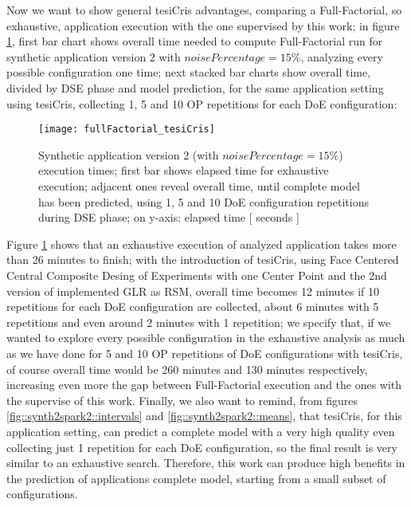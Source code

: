Now we want to show general tesiCris advantages, comparing a Full-Factorial, so exhaustive, application execution with the one supervised by this work; in figure \ref{fig::full_cris}, first bar chart shows overall time needed to compute Full-Factorial run for synthetic application version 2 with $noisePercentage = 15\%$, analyzing every possible configuration one time; next stacked bar charts show overall time, divided by DSE phase and model prediction, for the same application setting using tesiCris, collecting 1, 5 and 10 OP repetitions for each DoE configuration:

\begin{figure}[H]

    \centering
    \texttt{[image: fullFactorial\_tesiCris]}
    \caption{Synthetic application version 2 (with $noisePercentage = 15\%$) execution times; first bar shows elapsed time for exhaustive execution; adjacent ones reveal overall time, until complete model has been predicted, using 1, 5 and 10 DoE configuration repetitions during DSE phase; on y-axis: elapsed time [ seconds ]}
    \label{fig::full_cris}
    
\end{figure}

Figure \ref{fig::full_cris} shows that an exhaustive execution of analyzed application takes more than 26 minutes to finish; with the introduction of tesiCris, using Face Centered Central Composite Desing of Experiments with one Center Point and the 2nd version of implemented GLR as RSM, overall time becomes 12 minutes if 10 repetitions for each DoE configuration are collected, about 6 minutes with 5 repetitions and even around 2 minutes with 1 repetition; we specify that, if we wanted to explore every possible configuration in the exhaustive analysis as much as we have done for 5 and 10 OP repetitions of DoE configurations with tesiCris, of course overall time would be 260 minutes and 130 minutes respectively, increasing even more the gap between Full-Factorial execution and the ones with the supervise of this work. Finally, we also want to remind, from figures \ref{fig::synth2spark2::intervals} and \ref{fig::synth2spark2::means}, that tesiCris, for this application setting, can predict a complete model with a very high quality even collecting just 1 repetition for each DoE configuration, so the final result is very similar to an exhaustive search. Therefore, this work can produce high benefits in the prediction of applications complete model, starting from a small subset of configurations.


